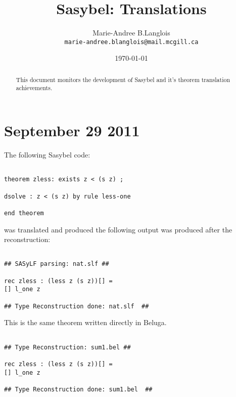 \documentclass[12pt]{article}
\begin{document}
\title{\textmd{Sasybel}: Translations}
\author{
        Marie-Andree B.Langlois \\
        \texttt{marie-andree.blanglois@mail.mcgill.ca}
}
\date{\today}
\maketitle

\begin{abstract}
This document monitors the development of Sasybel and it's theorem translation achievements.
\end{abstract}

\section{September 29 2011}
The following \textmd{Sasybel} code:
\begin{verbatim}

theorem zless: exists z < (s z) ;

dsolve : z < (s z) by rule less-one

end theorem

\end{verbatim}
was translated and produced the following output was produced after the reconstruction:
\begin{verbatim}

## SASyLF parsing: nat.slf ##

rec zless : (less z (s z))[] =
[] l_one z

## Type Reconstruction done: nat.slf  ##

\end{verbatim}
This is the same theorem written directly in \textmd{Beluga}.
\begin{verbatim}

## Type Reconstruction: sum1.bel ##

rec zless : (less z (s z))[] =
[] l_one z

## Type Reconstruction done: sum1.bel  ##
\end{verbatim}
\end{document}
